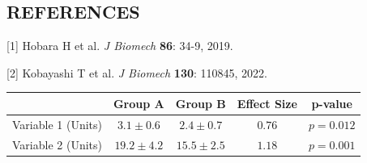 \documentclass[11pt]{article}
\newenvironment{Table}
  {\par\medskip\noindent\minipage{\linewidth}}
  {\endminipage\par\medskip}
\begin{document}
\begin{multicols}{2}
\section{REFERENCES}
[1] Hobara H et al. \textit{J Biomech} \textbf{86}: 34-9, 2019.

[2] Kobayashi T et al. \textit{J Biomech} \textbf{130}: 110845, 2022. 
\end{multicols}

\begin{Table}
    \begin{tabular*}{\textwidth}{@{\extracolsep{\fill}}lcccc}
        \hline
        & Group A & Group B & Effect Size & p-value\\
        \hline
         Variable 1 (Units) & $3.1\pm0.6$ &	$2.4\pm0.7$ & $0.76$ & $p = 0.012$  \\
         Variable 2 (Units)	& $19.2\pm4.2$ & $15.5\pm2.5$ & $1.18$ & $p = 0.001$\\
         \hline
    \end{tabular*}
    \label{tab:tab1}
\end{Table}
\end{document}
